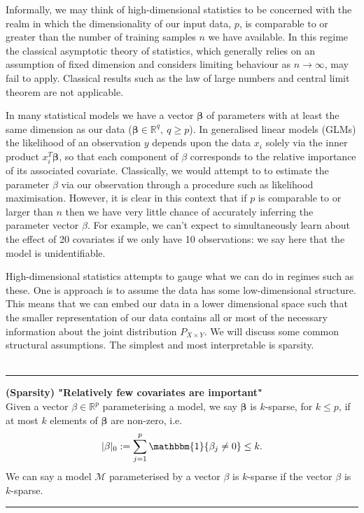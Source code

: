 \documentclass[thesis.tex]{subfiles}
\begin{document}
Informally, we may think of high-dimensional statistics to be concerned with the realm in which the dimensionality of our input data, $p$, is comparable to or greater than the number of training samples $n$ we have available. In this regime the classical asymptotic theory of statistics, which generally relies on an assumption of fixed dimension and considers limiting behaviour as $n \rightarrow \infty$, may fail to apply. Classical results such as the law of large numbers and central limit theorem are not applicable. 

In many statistical models we have a vector $\mathbf{\beta}$ of parameters with at least the same dimension as our data ($\mathbf{\beta} \in \mathbb{R}^q, \ q \geq p$). In generalised linear models (GLMs) the likelihood of an observation $y$ depends upon the data $x_i$ solely via the inner product $x_i^T\mathbf{\beta}$, so that each component of $\beta$ corresponds to the relative importance of its associated covariate. Classically, we would attempt to to estimate the parameter $\beta$ via our observation through a procedure such as likelihood maximisation. However, it is clear in this context that if $p$ is comparable to or larger than $n$ then we have very little chance of accurately inferring the parameter vector $\beta$. For example, we can't expect to simultaneously learn about the effect of 20 covariates if we only have 10 observations: we say here that the model is unidentifiable. 

High-dimensional statistics attempts to gauge what we can do in regimes such as these. One is approach is to assume the data has some low-dimensional structure. This means that we can embed our data in a lower dimensional space such that the smaller representation of our data contains all or most of the necessary information about the joint distribution $P_{X\times Y}$. We will discuss some common structural assumptions. The simplest and most interpretable is sparsity. \\~\\

\hrule 
\begin{definition}{\textbf{(Sparsity) "Relatively few covariates are important"} \label{def:sparse}} \\
Given a vector $\beta \in \mathbb{R}^p$ parameterising a model, we say $\mathbf{\beta}$ is $k$-sparse, for $k \leq p$, if at most $k$ elements of $\mathbf{\beta}$ are non-zero, i.e.
$$|\mathbf{\beta}|_0 := \sum_{j=1}^{p}\mathbbm{1}\{\beta_j \neq 0\} \leq k. $$
We can say a model $\mathcal{M}$ parameterised by a vector $\beta$ is $k$-sparse if the vector $\beta$ is $k$-sparse.
\end{definition}
\hrule 
~\\~\\
\end{document}
